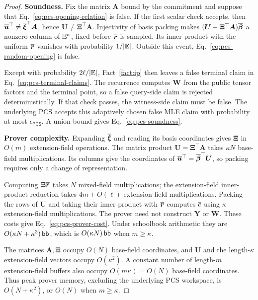 \begin{proof}
\smallskip\noindent\textbf{Soundness.}
Fix the matrix \(\bm A\) bound by the commitment and suppose that
Eq.~\eqref{eq:pcs-opening-relation} is false.
If the first scalar check accepts, then
\(\overline{\bm u}^{\top}\neq\overline{\bm\xi}^{\top}\bm A\), hence
\(\bm U\neq\bm\Xi^\top\bm A\).
Injectivity of basis packing makes
\((\bm U-\bm\Xi^\top\bm A)\overline{\bm\beta}\) a nonzero
column of \(\mathbb{E}^\kappa\), fixed before
\(\overline{\bm r}\) is sampled. Its inner product with the uniform
\(\overline{\bm r}\) vanishes with probability
\(1/|\mathbb{E}|\). Outside this event,
Eq.~\eqref{eq:pcs-random-opening} is false.

Except with probability \(2\ell/|\mathbb{E}|\),
Fact~\ref{fact:ip} then leaves a false terminal claim in
Eq.~\eqref{eq:pcs-terminal-claims}.
The recurrence computes \(\bm W\) from the public tensor factors
and the terminal point, so a false query-side claim is rejected
deterministically. If that check passes, the witness-side claim
must be false. The underlying PCS accepts this adaptively chosen
false MLE claim with probability at most
\(\epsilon_{\mathsf{PCS}}\).
A union bound gives Eq.~\eqref{eq:pcs-soundness}.

\smallskip\noindent\textbf{Prover complexity.}
Expanding \(\overline{\bm\xi}\) and reading its basis coordinates
gives \(\bm\Xi\) in \(O(m)\) extension-field operations.
The matrix product \(\bm U=\bm\Xi^\top\bm A\) takes
\(\kappa N\) base-field multiplications. Its columns give the
coordinates of \(\overline{\bm u}^{\top}=\overline{\bm\beta}^{\top}\bm U\),
so packing requires only a change of representation.

Computing \(\bm\Xi\overline{\bm r}\) takes \(N\) mixed-field
multiplications; the extension-field inner-product reduction takes
\(4m+O(\ell)\) extension-field multiplications.
Packing the rows of \(\bm U\) and taking their inner product
with \(\overline{\bm r}\) computes \(\overline{c}\) using
\(\kappa\) extension-field multiplications.
The prover need not construct \(\bm Y\) or \(\bm W\).
These costs give Eq.~\eqref{eq:pcs-prover-cost}.
Under schoolbook arithmetic they are
\(O(\kappa N+\kappa^3)\,\mathsf{bb}\), which is
\(O(\kappa N)\,\mathsf{bb}\) when \(m\geq\kappa\).

The matrices \(\bm A,\bm\Xi\) occupy \(O(N)\) base-field
coordinates, and \(\bm U\) and the length-\(\kappa\)
extension-field vectors occupy \(O(\kappa^2)\).
A constant number of length-\(m\) extension-field buffers also
occupy \(O(m\kappa)=O(N)\) base-field coordinates.
Thus peak prover memory, excluding the underlying PCS workspace,
is \(O(N+\kappa^2)\), or \(O(N)\) when \(m\geq\kappa\).


\end{proof}
